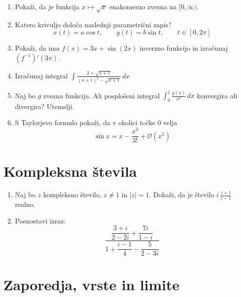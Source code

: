 \documentclass[a4paper,12pt]{article}
\begin{document}
\begin{enumerate}
\item
Pokaži, da je funkcija $x \mapsto \sqrt{x}$ enakomerno zvezna na $\lbrack 0, \infty )$.

\item
Katero krivuljo določa naslednji parametrični zapis?
\[
x(t) = a \cos t, \qquad %
y(t) = b \sin t, \qquad %
t \in [0, 2 \pi]
\]

\item
Pokaži, da ima $f(x) = 3x + \sin(2x)$ inverzno funkcijo in izračunaj $(f^{-1})'(3\pi)$.

\item
Izračunaj integral
$\displaystyle{\int \frac{2+\sqrt{x+1}}{(x+1)^2-\sqrt{x+1}}\, dx}$

\item
Naj bo \(g\) zvezna funkcija. Ali posplošeni integral
$\int_{0}^{1}\frac{g(x)}{x^2}\, dx$
konvergira ali divergira? Utemelji.

\item
S Taylorjevo formulo pokaži, da v okolici točke \(0\) velja
\[
    \sin x = x - \frac{x^3}{3!} + \mathcal{O}(x^5)
\]
\end{enumerate}

\section*{Kompleksna števila}

\begin{enumerate}
\item
Naj bo \(z\) kompleksno število, \(z \ne 1\) in $\lvert z \lvert = 1$.
Dokaži, da je število \( i \, \frac{z+1}{z-1} \) realno.

\item
Poenostavi izraz:
\[
    \frac{\dfrac{3+i}{2-2i} + \dfrac{7i}{1-i}}{1 + \dfrac{i-1}{4} - \dfrac{5}{2-3i}}
\]
\end{enumerate}

\section*{Zaporedja, vrste in limite}
\end{document}
